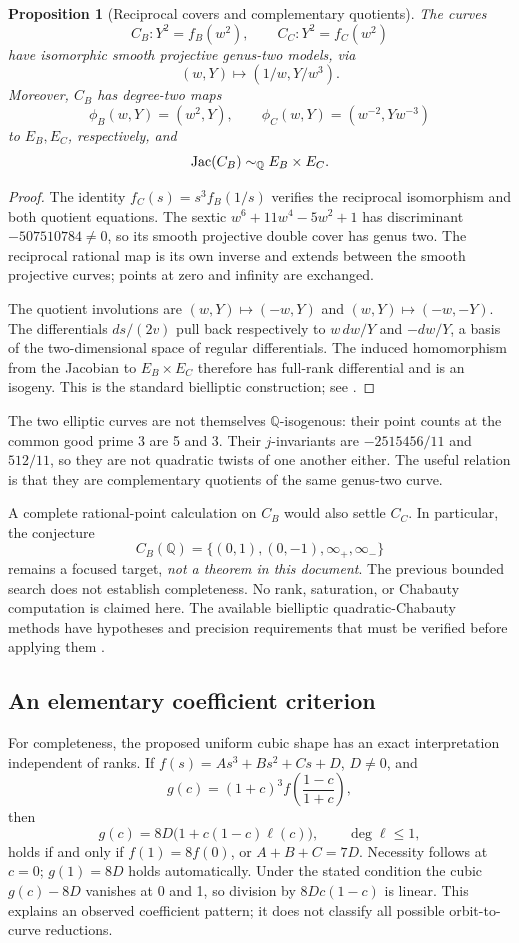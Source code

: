 \documentclass[11pt]{article}
\newtheorem{proposition}[theorem]{Proposition}
\theoremstyle{definition}\newtheorem{definition}[theorem]{Definition}
\theoremstyle{remark}\newtheorem{remark}[theorem]{Remark}
\newcommand{\Q}{\mathbb Q}\newcommand{\Z}{\mathbb Z}\newcommand{\R}{\mathbb R}
\begin{document}
\begin{proposition}[Reciprocal covers and complementary quotients]\label{prop:BC}
The curves
\[
C_B:Y^2=f_B(w^2),\qquad C_C:Y^2=f_C(w^2)
\]
have isomorphic smooth projective genus-two models, via
\[
(w,Y)\longmapsto(1/w,Y/w^3).
\]
Moreover, $C_B$ has degree-two maps
\[
\phi_B(w,Y)=(w^2,Y),\qquad
\phi_C(w,Y)=(w^{-2},Yw^{-3})
\]
to $E_B,E_C$, respectively, and
\[
\Jac(C_B)\sim_\Q E_B\times E_C.
\]
\end{proposition}
\begin{proof}
The identity $f_C(s)=s^3f_B(1/s)$ verifies the reciprocal isomorphism and both quotient equations. The sextic $w^6+11w^4-5w^2+1$ has discriminant $-507510784\ne0$, so its smooth projective double cover has genus two. The reciprocal rational map is its own inverse and extends between the smooth projective curves; points at zero and infinity are exchanged.

The quotient involutions are $(w,Y)\mapsto(-w,Y)$ and $(w,Y)\mapsto(-w,-Y)$. The differentials $ds/(2v)$ pull back respectively to $w\,dw/Y$ and $-dw/Y$, a basis of the two-dimensional space of regular differentials. The induced homomorphism from the Jacobian to $E_B\times E_C$ therefore has full-rank differential and is an isogeny. This is the standard bielliptic construction; see \cite[Section 2]{BP}.
\end{proof}

The two elliptic curves are not themselves $\Q$-isogenous: their point counts at the common good prime 3 are 5 and 3. Their $j$-invariants are $-2515456/11$ and $512/11$, so they are not quadratic twists of one another either. The useful relation is that they are complementary quotients of the same genus-two curve.

A complete rational-point calculation on $C_B$ would also settle $C_C$. In particular, the conjecture
\[
C_B(\Q)=\{(0,1),(0,-1),\infty_+,\infty_-\}
\]
remains a focused target, \emph{not a theorem in this document}. The previous bounded search does not establish completeness. No rank, saturation, or Chabauty computation is claimed here. The available bielliptic quadratic-Chabauty methods have hypotheses and precision requirements that must be verified before applying them \cite{BP}.

\subsection{An elementary coefficient criterion}
For completeness, the proposed uniform cubic shape has an exact interpretation independent of ranks. If
$f(s)=As^3+Bs^2+Cs+D$, $D\ne0$, and
\[
g(c)=(1+c)^3f\left(\frac{1-c}{1+c}\right),
\]
then
\[
g(c)=8D\bigl(1+c(1-c)\ell(c)\bigr),\qquad \deg\ell\le1,
\]
holds if and only if $f(1)=8f(0)$, or $A+B+C=7D$. Necessity follows at $c=0$; $g(1)=8D$ holds automatically. Under the stated condition the cubic $g(c)-8D$ vanishes at 0 and 1, so division by $8Dc(1-c)$ is linear. This explains an observed coefficient pattern; it does not classify all possible orbit-to-curve reductions.
\end{document}
